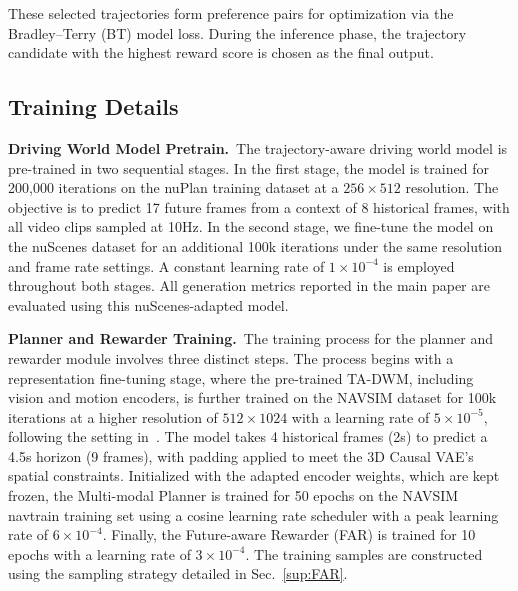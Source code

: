 These selected trajectories form preference pairs for optimization via the Bradley--Terry (BT) model loss. During the inference phase, the trajectory candidate with the highest reward score is chosen as the final output.

\subsection{Training Details}
\noindent\textbf{Driving World Model Pretrain.}~The trajectory-aware driving world model is pre-trained in two sequential stages. In the first stage, the model is trained for 200,000 iterations on the nuPlan training dataset at a $256 \times 512$ resolution. The objective is to predict 17 future frames from a context of 8 historical frames, with all video clips sampled at 10Hz. In the second stage, we fine-tune the model on the nuScenes dataset for an additional 100k iterations under the same resolution and frame rate settings. A constant learning rate of $1 \times 10^{-4}$ is employed throughout both stages. All generation metrics reported in the main paper are evaluated using this nuScenes-adapted model.

\noindent\textbf{Planner and Rewarder Training.}~The training process for the planner and rewarder module involves three distinct steps. The process begins with a representation fine-tuning stage, where the pre-trained TA-DWM, including vision and motion encoders, is further trained on the NAVSIM dataset for 100k iterations at a higher resolution of $512 \times 1024$ with a learning rate of $5 \times 10^{-5}$, following the setting in~\cite{epona}. The model takes 4 historical frames (2s) to predict a 4.5s horizon (9 frames), with padding applied to meet the 3D Causal VAE's spatial constraints. Initialized with the adapted encoder weights, which are kept frozen, the Multi-modal Planner is trained for 50 epochs on the NAVSIM navtrain training set using a cosine learning rate scheduler with a peak learning rate of $6 \times 10^{-4}$. Finally, the Future-aware Rewarder (FAR) is trained for 10 epochs with a learning rate of $3 \times 10^{-4}$. The training samples are constructed using the sampling strategy detailed in Sec.~\ref{sup:FAR}.

\begin{table}[t]
    \centering
    \setlength{\tabcolsep}{10pt}
\caption{\textbf{Ablation on the number of trajectory candidates for Future-aware Rewarder.}~Top-K indicates the trajectories with the K highest predicted scores from the multi-modal planner.}
\label{tab:topk}
\end{table}



